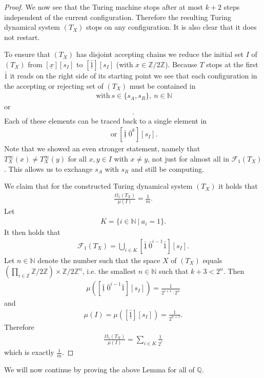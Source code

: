 \documentclass[12pt,a4paper]{scrartcl}
\theoremstyle{plain}
\theoremstyle{definition}
\newcommand{\Q}{\mathbb{Q}} %
\newcommand{\Z}{\mathbb{Z}} %
\newcommand{\N}{\mathbb{N}} %
\newcommand{\2}{\mathbb{Z} / 2 \mathbb{Z}}
\newcommand{\1}{\bar{1}}
\newcommand{\0}{\bar{0}}
\begin{document}
\begin{proof}
	We now see that the Turing machine stops after at most $k+2$ steps independent of the current configuration. Therefore the resulting Turing dynamical system $(T_X)$ stops on any configuration. It is also clear that it does not restart.
	
	To ensure that $(T_X)$ has disjoint accepting chains we reduce the initial set $I$ of $(T_X)$ from $[\underline{x}][s_I]$ to $[\underline{\1}][s_I]$ (with $x \in \2$). Because $T$ stops at the first $\1$ it reads on the right side of its starting point we see that each configuration in the accepting or rejecting set of $(T_X)$ must be contained in
	\begin{align*}
		[\1 \ \0^n \ \underline{\1}][s] \ \text{with} \ s \in \{s_A, s_R\}, \ n \in \N
	\end{align*} 
	or
	\begin{align*}
		[\1 \ \0^{k-1} \ \underline{\0}][s_R].
	\end{align*}
	Each of these elements can be traced back to a single element in
	\begin{align*}
	[\underline{\1} \ \0^{n} \ \1][s_I] \ \text{or} \ [\underline{\1}  \ \0^{k}][s_I].
	\end{align*} 
	Note that we showed an even stronger statement, namely that $T_X^\infty (x) \neq T_X^\infty (y)$ for all $x, y \in I$ with $x \neq y$, not just for almost all in $\mathcal{F}_1(T_X)$. This allows us to exchange $s_A$ with $s_R$ and still be computing.
	
	We claim that for the constructed Turing dynamical system $(T_X)$ it holds that
	\begin{align*}
		\frac{\Omega_1(T_X)}{\mu(I)} = \frac{1}{m}.
	\end{align*}
	Let
	\begin{align*}
		K = \{i \in \N ~|~ a_i =1\}.
	\end{align*}
	It then holds that
	\begin{align*}
		\mathcal{F}_1(T_X) = \bigcup_{i \in K}[\underline{\1} \ \0^{i-1} \1][s_I].
	\end{align*}
	Let $n \in \N$ denote the number such that the space $X$ of $(T_X)$ equals $(\prod_{i \in \Z} \2) \times \2^n$, i.e. the smallest $n \in \N$ such that $k+3 < 2^n$. Then 
	\begin{align*}
		\mu([\underline{\1} \ \0^{i-1} \1][s_I]) = \frac{1}{2^ {i + 1} \cdot 2^n}
	\end{align*}
	and
	\begin{align*}
		\mu(I) = \mu([\underline{\1}][s_I]) = \frac{1}{2^{n + 1}}.
	\end{align*}
	Therefore 
	\begin{align*}
		\frac{\Omega_1(T_X)}{\mu(I)} = \sum_{i \in K} \frac{1}{2^i}
	\end{align*}
	which is exactly $\frac{1}{m}$.
\end{proof}
We will now continue by proving the above Lemma for all of $\Q$.
\end{document}
